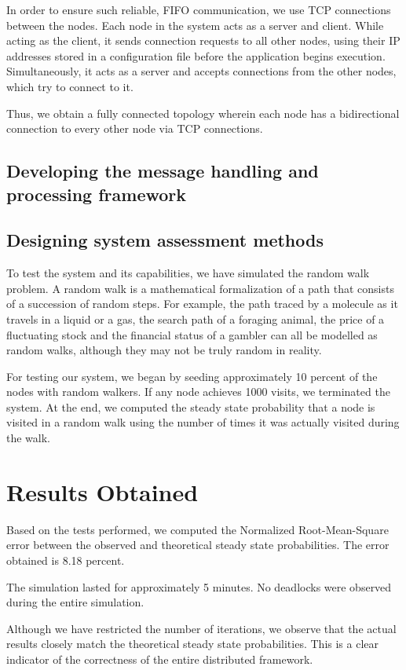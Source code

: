 \documentclass[12pt,a4paper]{article}
\begin{document}
In order to ensure such reliable, FIFO communication, we use TCP connections between the nodes. Each node in the system acts as a server and client. While acting as the client, it sends connection requests to all other nodes, using their IP addresses stored in a configuration file before the application begins execution. Simultaneously, it acts as a server and accepts connections from the other nodes, which try to connect to it.

Thus, we obtain a fully connected topology wherein each node has a bidirectional connection to every other node via TCP connections.
	\subsection{Developing the message handling and processing framework}

	\subsection{Designing system assessment methods}
To test the system and its capabilities, we have simulated the random walk problem. A random walk is a mathematical formalization of a path that consists of a succession of random steps. For example, the path traced by a molecule as it travels in a liquid or a gas, the search path of a foraging animal, the price of a fluctuating stock and the financial status of a gambler can all be modelled as random walks, although they may not be truly random in reality.

For testing our system, we began by seeding approximately 10 percent of the nodes with random walkers. If any node achieves 1000 visits, we terminated the system. At the end, we computed the steady state probability that a node is visited in a random walk using the number of times it was actually visited during the walk.
	 
\section{Results Obtained}
Based on the tests performed, we computed the Normalized Root-Mean-Square error between the observed and theoretical steady state probabilities. The error obtained is 8.18 percent.

The simulation lasted for approximately 5 minutes. No deadlocks were observed during the entire simulation.

Although we have restricted the number of iterations, we observe that the actual results closely match the theoretical steady state probabilities. This is a clear indicator of the correctness of the entire distributed framework.
\end{document}
